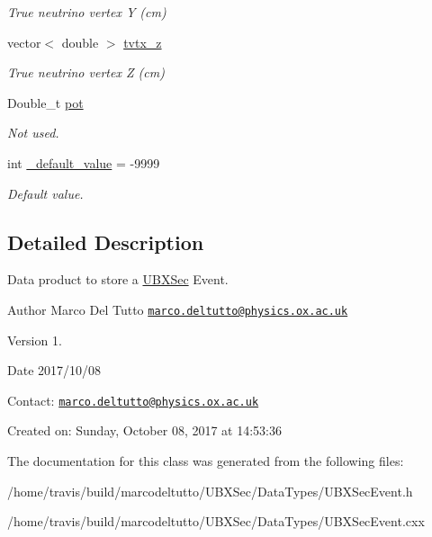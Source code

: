 \begin{DoxyCompactItemize}
\begin{DoxyCompactList}\small\item\em True neutrino vertex Y (cm) \end{DoxyCompactList}\item 
\hypertarget{classUBXSecEvent_afcae666a9433c56792d47c53856d66ac}{vector$<$ double $>$ \hyperlink{classUBXSecEvent_afcae666a9433c56792d47c53856d66ac}{tvtx\-\_\-z}}\label{classUBXSecEvent_afcae666a9433c56792d47c53856d66ac}

\begin{DoxyCompactList}\small\item\em True neutrino vertex Z (cm) \end{DoxyCompactList}\item 
\hypertarget{classUBXSecEvent_ad783d4eedd7be14db4d5b7b9cb2d144a}{Double\-\_\-t \hyperlink{classUBXSecEvent_ad783d4eedd7be14db4d5b7b9cb2d144a}{pot}}\label{classUBXSecEvent_ad783d4eedd7be14db4d5b7b9cb2d144a}

\begin{DoxyCompactList}\small\item\em Not used. \end{DoxyCompactList}\item 
\hypertarget{classUBXSecEvent_a88e5ff2c7d0db95750e980740231d80b}{int \hyperlink{classUBXSecEvent_a88e5ff2c7d0db95750e980740231d80b}{\-\_\-default\-\_\-value} = -\/9999}\label{classUBXSecEvent_a88e5ff2c7d0db95750e980740231d80b}

\begin{DoxyCompactList}\small\item\em Default value. \end{DoxyCompactList}\end{DoxyCompactItemize}


\subsection{Detailed Description}
Data product to store a \hyperlink{classUBXSec}{U\-B\-X\-Sec} Event. 

\begin{DoxyAuthor}{Author}
Marco Del Tutto \href{mailto:marco.deltutto@physics.ox.ac.uk}{\tt marco.\-deltutto@physics.\-ox.\-ac.\-uk}
\end{DoxyAuthor}
\begin{DoxyVersion}{Version}
1.
\end{DoxyVersion}
\begin{DoxyDate}{Date}
2017/10/08
\end{DoxyDate}
Contact\-: \href{mailto:marco.deltutto@physics.ox.ac.uk}{\tt marco.\-deltutto@physics.\-ox.\-ac.\-uk}

Created on\-: Sunday, October 08, 2017 at 14\-:53\-:36 

The documentation for this class was generated from the following files\-:\begin{DoxyCompactItemize}
\item 
/home/travis/build/marcodeltutto/\-U\-B\-X\-Sec/\-Data\-Types/U\-B\-X\-Sec\-Event.\-h\item 
/home/travis/build/marcodeltutto/\-U\-B\-X\-Sec/\-Data\-Types/U\-B\-X\-Sec\-Event.\-cxx\end{DoxyCompactItemize}
